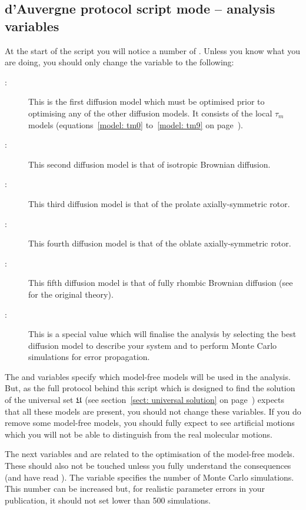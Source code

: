 
\subsection{d'Auvergne protocol script mode -- analysis variables} \label{sect: d'Auvergne protocol script variables}

At the start of the script you will notice a number of .
Unless you know what you are doing, you should only change the  variable to the following:
\begin{description}
  \item[:]  This is the first diffusion model which must be optimised prior to optimising any of the other diffusion models.
    It consists of the local $\tau_m$ models (equations~\ref{model: tm0} to~\ref{model: tm9} on page~\pageref{model: tm0}).
  \item[:]  This second diffusion model is that of isotropic Brownian diffusion.
  \item[:]  This third diffusion model is that of the prolate axially-symmetric rotor.
  \item[:]  This fourth diffusion model is that of the oblate axially-symmetric rotor.
  \item[:]  This fifth diffusion model is that of fully rhombic Brownian diffusion (see \citet{Perrin34,Perrin36} for the original theory).
  \item[:]  This is a special value which will finalise the analysis by selecting the best diffusion model to describe your system and to perform Monte Carlo simulations for error propagation.
\end{description}

The  and   variables specify which model-free models will be used in the analysis.
But, as the full protocol behind this script which is designed to find the solution of the universal set $\mathfrak{U}$ (see section~\ref{sect: universal solution} on page~\pageref{sect: universal solution}) expects that all these models are present, you should not change these variables.
If you do remove some model-free models, you should fully expect to see artificial motions which you will not be able to distinguish from the real molecular motions.

The next variables  and  are related to the optimisation of the model-free models.
These should also not be touched unless you fully understand the consequences (and have read \citet{dAuvergneGooley08a}).
The variable  specifies the number of Monte Carlo simulations.
This number can be increased but, for realistic parameter errors in your publication, it should not set lower than 500 simulations.

